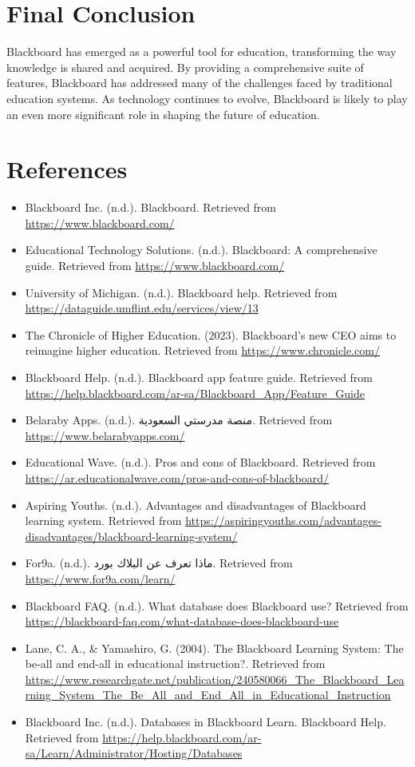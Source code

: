 \documentclass[a4paper,12pt]{article}
\begin{document}
\newpage

\section{Final Conclusion}

Blackboard has emerged as a powerful tool for education, transforming the
way knowledge is shared and acquired. By providing a comprehensive suite of
features, Blackboard has addressed many of the challenges faced by traditional
education systems. As technology continues to evolve, Blackboard is likely to
play an even more significant role in shaping the future of education.


\section{References}

\begin{itemize}
    \item Blackboard Inc. (n.d.). Blackboard. Retrieved from \url{https://www.blackboard.com/}
    \item Educational Technology Solutions. (n.d.). Blackboard: A comprehensive guide. Retrieved from \url{https://www.blackboard.com/}
    \item University of Michigan. (n.d.). Blackboard help. Retrieved from \url{https://dataguide.umflint.edu/services/view/13}
    \item The Chronicle of Higher Education. (2023). Blackboard's new CEO aims to reimagine higher education. Retrieved from \url{https://www.chronicle.com/}
    \item Blackboard Help. (n.d.). Blackboard app feature guide. Retrieved from \url{https://help.blackboard.com/ar-sa/Blackboard_App/Feature_Guide}
    \item Belaraby Apps. (n.d.). منصة مدرستي السعودية. Retrieved from \url{https://www.belarabyapps.com/}
    \item Educational Wave. (n.d.). Pros and cons of Blackboard. Retrieved from \url{https://ar.educationalwave.com/pros-and-cons-of-blackboard/}
    \item Aspiring Youths. (n.d.). Advantages and disadvantages of Blackboard learning system. Retrieved from \url{https://aspiringyouths.com/advantages-disadvantages/blackboard-learning-system/}
    \item For9a. (n.d.). ماذا تعرف عن البلاك بورد. Retrieved from \url{https://www.for9a.com/learn/}
    \item Blackboard FAQ. (n.d.). What database does Blackboard use? Retrieved from \url{https://blackboard-faq.com/what-database-does-blackboard-use}
    \item Lane, C. A., & Yamashiro, G. (2004). The Blackboard Learning System: The be-all and end-all in educational instruction?. Retrieved from \url{https://www.researchgate.net/publication/240580066_The_Blackboard_Learning_System_The_Be_All_and_End_All_in_Educational_Instruction}
    \item Blackboard Inc. (n.d.). Databases in Blackboard Learn. Blackboard Help. Retrieved from \url{https://help.blackboard.com/ar-sa/Learn/Administrator/Hosting/Databases}
\end{itemize}
\end{document}
